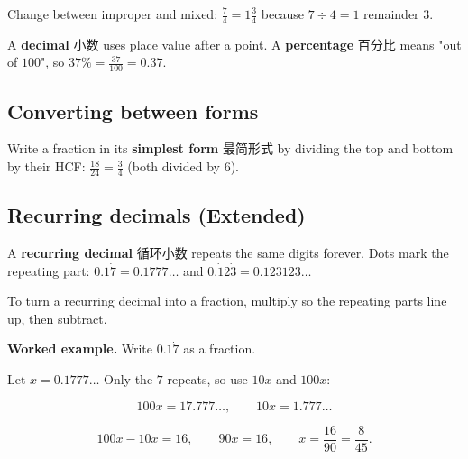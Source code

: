 \documentclass[11pt]{article}
\begin{document}
Change between improper and mixed: $\frac{7}{4} = 1\frac{3}{4}$ because $7 \div 4 = 1$ remainder $3$.

A \textbf{decimal} 小数 uses place value after a point. A \textbf{percentage} 百分比 means "out of $100$", so $37\% = \frac{37}{100} = 0.37$.

\subsection*{Converting between forms}

\begin{center}
\end{center}

Write a fraction in its \textbf{simplest form} 最简形式 by dividing the top and bottom by their HCF: $\frac{18}{24} = \frac{3}{4}$ (both divided by $6$).

\subsection*{Recurring decimals (Extended)}

A \textbf{recurring decimal} 循环小数 repeats the same digits forever. Dots mark the repeating part: $0.1\dot{7} = 0.1777\ldots$ and $0.\dot{1}2\dot{3} = 0.123123\ldots$

To turn a recurring decimal into a fraction, multiply so the repeating parts line up, then subtract.

\textbf{Worked example.} Write $0.1\dot{7}$ as a fraction.

Let $x = 0.1777\ldots$ Only the $7$ repeats, so use $10x$ and $100x$:

\[
100x = 17.777\ldots, \qquad 10x = 1.777\ldots
\]

\[
100x - 10x = 16, \qquad 90x = 16, \qquad x = \frac{16}{90} = \frac{8}{45}.
\]
\end{document}
